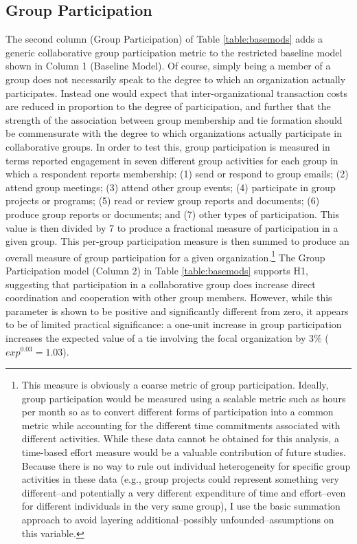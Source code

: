 \documentclass[12pt,a4paper,titlepage]{article}
\begin{document}
\subsection{Group Participation}

The second column (Group Participation) of Table \ref{table:basemods} adds a generic collaborative group participation metric to the restricted baseline model shown in Column 1 (Baseline Model). Of course, simply being a member of a group does not necessarily speak to the degree to which an organization actually participates. Instead one would expect that inter-organizational transaction costs are reduced in proportion to the degree of participation, and further that the strength of the association between group membership and tie formation should be commensurate with the degree to which organizations actually participate in collaborative groups. In order to test this, group participation is measured in terms reported engagement in seven different group activities for each group in which a respondent reports membership: (1) send or respond to group emails; (2) attend group meetings; (3) attend other group events; (4) participate in group projects or programs; (5) read or review group reports and documents; (6) produce group reports or documents; and (7) other types of participation. This value is then divided by 7 to produce a fractional measure of participation in a given group. This per-group participation measure is then summed to produce an overall measure of group participation for a given organization.\footnote{This measure is obviously a coarse metric of group participation. Ideally, group participation would be measured using a scalable metric such as hours per month so as to convert different forms of participation into a common metric while accounting for the different time commitments associated with different activities. While these data cannot be obtained for this analysis, a time-based effort measure would be a valuable contribution of future studies. Because there is no way to rule out individual heterogeneity for specific group activities in these data (e.g., group projects could represent something very different--and potentially a very different expenditure of time and effort--even for different individuals in the very same group), I use the basic summation approach to avoid layering additional--possibly unfounded--assumptions on this variable.} The Group Participation model (Column 2) in Table \ref{table:basemods} supports H1, suggesting that participation in a collaborative group does increase direct coordination and cooperation with other group members. However, while this parameter is shown to be positive and significantly different from zero, it appears to be of limited practical significance: a one-unit increase in group participation increases the expected value of a tie involving the focal organization by $3\%$ ($exp^{0.03} = 1.03$). 
\end{document}
